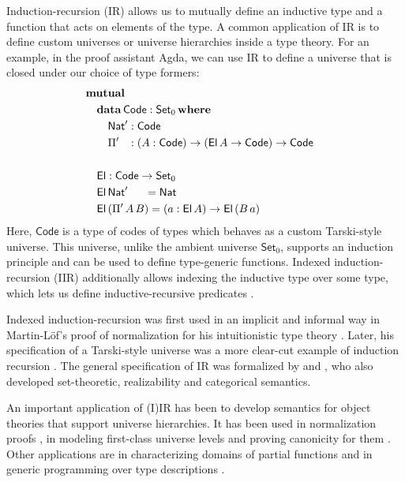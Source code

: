 \documentclass[acmsmall,screen,review,anonymous]{acmart}
\newcommand{\msf}[1]{{\mathsf{#1}}}
\newcommand{\mbf}[1]{{\mathbf{#1}}}
\newcommand{\data}{\mbf{data}}
\newcommand{\Set}{\msf{Set}}
\newcommand{\where}{\mbf{where}}
\newcommand{\Nat}{\msf{Nat}}
\newcommand{\El}{\msf{El}}
\newcommand{\Code}{\msf{Code}}
\begin{document}
Induction-recursion (IR) allows us to mutually define an inductive type and a function that acts on
elements of the type. A common application of IR is to define custom universes or universe
hierarchies inside a type theory. For an example, in the proof assistant Agda, we can use IR to
define a universe that is closed under our choice of type formers:
\begin{alignat*}{3}
  & \mbf{mutual} \\
  & \quad\data\,\Code : \Set_0\,\where \\
  & \quad\quad \Nat' : \Code\\
  & \quad\quad \Pi' \hspace{0.8em} : (A : \Code) \to (\El\,A \to \Code) \to \Code
  & \\
  & \\
  & \quad\El : \Code \to \Set_0 \\
  & \quad\El\,\Nat'\hspace{1.5em}  = \Nat \\
  & \quad\El\,(\Pi'\,A\,B) = (a : \El\,A) \to \El\,(B\,a)
\end{alignat*}
Here, $\Code$ is a type of codes of types which behaves as a custom Tarski-style universe. This
universe, unlike the ambient universe $\Set_0$, supports an induction principle and can be used to
define type-generic functions. Indexed induction-recursion (IIR) additionally allows indexing the
inductive type over some type, which lets us define inductive-recursive predicates
\cite{DBLP:journals/jlp/DybjerS06}.

Indexed induction-recursion was first used in an implicit and informal way in Martin-Löf's proof of
normalization for his intuitionistic type theory \cite{martin1975intuitionistic}. Later, his
specification of a Tarski-style universe was a more clear-cut example of induction recursion
\cite{martinlof84sambin}. The general specification of IR was formalized by
\citet{DBLP:journals/jsyml/Dybjer00} and
\citet{dybjer99finite,DBLP:journals/jlp/DybjerS06,DBLP:journals/apal/DybjerS03}, who also developed
set-theoretic, realizability and categorical semantics.

An important application of (I)IR has been to develop semantics for object theories that support
universe hierarchies. It has been used in normalization proofs
\cite{DBLP:journals/pacmpl/0001OV18,DBLP:journals/pacmpl/PujetT23,DBLP:journals/pacmpl/AbelDE23}, in
modeling first-class universe levels \cite{first-class-univ} and proving canonicity for them
\cite{DBLP:journals/corr/abs-2502-20485}. Other applications are in characterizing domains of
partial functions \cite{DBLP:conf/tphol/BoveC01} and in generic programming over type descriptions
\cite{DBLP:journals/njc/BenkeDJ03,diehl2017fully}.
\end{document}
